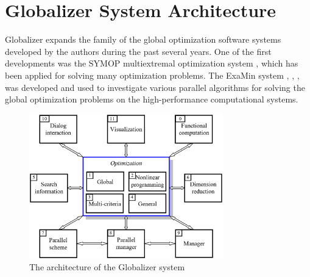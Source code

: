 \documentclass{naco}
\theoremstyle{definition}
\begin{document}
\section{Globalizer System Architecture}
\label{sec:arch}
Globalizer expands the family of the global optimization software systems developed
by the authors during the past several years. One of the first developments was the
SYMOP multiextremal optimization system \cite{gergel1993}, which has been applied for solving
many optimization problems. The ExaMin system \cite{barkalovGergel2015}, \cite{barkalovGergelLebedev2015},
\cite{barkalovGergelLebedevSysoev2015}, \cite{gergelLebedev2015} was developed
and used to investigate various parallel algorithms for solving the global
optimization problems on the high-performance computational systems.

\begin{figure}
    \centering
    \includegraphics[width=0.75\textwidth]{pictures/globalizerScheme.eps}
    \caption{The architecture of the Globalizer system}
    \label{fig:globalizerScheme}
\end{figure}
\end{document}
